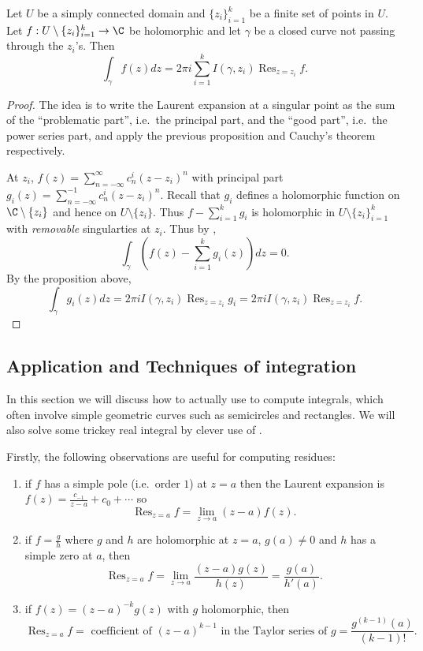 \documentclass[a4paper]{article}
\DeclareMathOperator*{\res}{Res}
\begin{document}
\begin{theorem}
  \label{thm:residue}
  Let \(U\) be a simply connected domain and \(\{z_i\}_{i = 1}^k\) be a finite set of points in \(U\). Let \(f: U \setminus \{z_i\}_{i = 1}^k \to \C\) be holomorphic and let \(\gamma\) be a closed curve not passing through the \(z_i\)'s. Then
  \[
    \int_\gamma f(z)dz = 2\pi i \sum_{i = 1}^k I(\gamma, z_i) \res_{z = z_i} f.
  \]
\end{theorem}

\begin{proof}
  The idea is to write the Laurent expansion at a singular point as the sum of the ``problematic part'', i.e.\ the principal part, and the ``good part'', i.e.\ the power series part, and apply the previous proposition and Cauchy's theorem respectively.

  At \(z_i\), \(f(z) = \sum_{n = -\infty}^\infty c_n^i (z - z_i)^n\) with principal part \(g_i(z) = \sum_{n = -\infty}^{-1} c_n^i(z - z_i)^n\). Recall that \(g_i\) defines a holomorphic function on \(\C \setminus \{z_i\}\) and hence on \(U \setminus \{z_i\}\). Thus \(f - \sum_{i = 1}^kg_i\) is holomorphic in \(U \setminus \{z_i\}_{i = 1}^k\) with \emph{removable} singularties at \(z_i\). Thus by ,
  \[
    \int_\gamma (f(z) - \sum_{i = 1}^k g_i(z)) dz = 0.
  \]
  By the proposition above,
  \[
    \int_\gamma g_i(z) dz = 2\pi i I(\gamma, z_i) \res_{z = z_i} g_i = 2\pi i I(\gamma, z_i) \res_{z = z_i} f.
  \]
\end{proof}

\subsection{Application and Techniques of integration}

In this section we will discuss how to actually use  to compute integrals, which often involve simple geometric curves such as semicircles and rectangles. We will also solve some trickey real integral by clever use of .

Firstly, the following observations are useful for computing residues:
\begin{enumerate}
\item if \(f\) has a simple pole (i.e.\ order \(1\)) at \(z = a\) then the Laurent expansion is \(f(z) = \frac{c_{-1}}{z - a} + c_0 + \cdots\) so
  \[
    \res_{z = a}f = \lim_{z \to a} (z - a)f(z).
  \]
\item if \(f = \frac{g}{h}\) where \(g\) and \(h\) are holomorphic at \(z = a\), \(g(a) \neq 0\) and \(h\) has a simple zero at \(a\), then
  \[
    \res_{z = a} f
    = \lim_{z \to a} \frac{(z - a)g(z)}{h(z)}
    =  \frac{g(a)}{h'(a)}.
  \]
\item if \(f(z) = (z - a)^{-k}g(z)\) with \(g\) holomorphic, then
  \[
    \res_{z = a}f
    = \text{ coefficient of } (z - a)^{k - 1} \text{ in the Taylor series of } g
    = \frac{g^{(k - 1)}(a)}{(k - 1)!}.
  \]
\end{enumerate}
\end{document}
